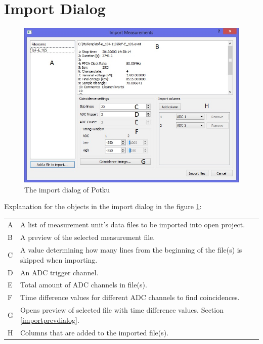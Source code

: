 \documentclass{scrreprt}
\begin{document}
\section{Import Dialog}\label{importdialog}
\begin{figure}[H]
\centering
\includegraphics[width=140mm]{importdialog}
\caption{The import dialog of Potku}
\label{fig-importdialog}
\end{figure}
Explanation for the objects in the import dialog in the figure \ref{fig-importdialog}:

\begin{tabular}{ll}
A & A list of measurement unit's data files to be imported into open project.\\
B & A preview of the selected measurement file.\\
C & A value determining how many lines from the beginning of the file(s) is skipped when importing.\\
D & An ADC trigger channel.\\
E & Total amount of ADC channels in file(s).\\
F & Time difference values for different ADC channels to find coincidences.\\
G & Opens preview of selected file with time difference values. Section \ref{importprevdialog}.\\
H & Columns that are added to the imported file(s).\\
\end{tabular}

\end{document}
